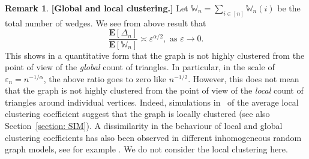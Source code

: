 \documentclass[11pt, reqno]{amsart}
\numberwithin{equation}{section}
\theoremstyle{plain} %
\theoremstyle{definition} %
\newtheorem{remark}[theorem]{Remark}
\newcommand{\eps}{\varepsilon}
\newcommand{\E}{\mathbf{E}}
\begin{document}
\begin{remark}{\bf[Global and local clustering.]}
Let $\mathbb{W}_n=\sum_{i\in [n]}\mathbb{W}_n(i)$ be the total number of wedges. We see from above result that
$$\frac{ \E[ \Delta_n]}{\E[\mathbb{W}_n]} \asymp \eps^{\alpha/2}, \text{ as } \eps \to0.$$
 This shows in a quantitative form that the graph is not highly clustered from the point of view of the \emph{global} count of triangles. In particular, in the  scale of $\eps_n= n^{-1/\alpha}$, the above ratio goes to zero like $n^{-1/2}$. However, this does not mean that the graph is not highly clustered from the point of view of the \emph{local} count of triangles around individual vertices. Indeed, simulations in~\cite{GMD2020} of the average local clustering coefficient suggest that the graph is locally clustered (see also Section~\ref{section: SIM}). A dissimilarity in the behaviour of local and global clustering coefficients has also been observed in different inhomogeneous random graph models, see for example \cite{van2020limit, PhysRevE.95.022307, michielan2022detecting}. We do not consider the local clustering here.  
 \end{remark}

\end{document}
